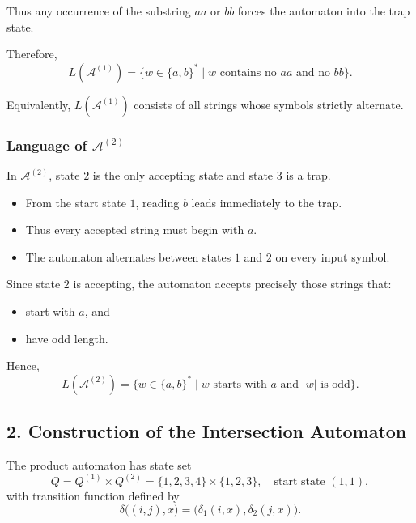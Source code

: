 \documentclass{article}
\theoremstyle{theorem}
\theoremstyle{definition}
\theoremstyle{remark}
\begin{document}
Thus any occurrence of the substring $aa$ or $bb$ forces the automaton into the trap state.

Therefore,
\[
L(\mathcal A^{(1)}) 
= \{ w \in \{a,b\}^* \mid w \text{ contains no } aa \text{ and no } bb \}.
\]

Equivalently, $L(\mathcal A^{(1)})$ consists of all strings whose symbols strictly alternate.

\bigskip

\subsubsection*{Language of $\mathcal A^{(2)}$}

In $\mathcal A^{(2)}$, state $2$ is the only accepting state and state $3$ is a trap.

\begin{itemize}
    \item From the start state $1$, reading $b$ leads immediately to the trap.
    \item Thus every accepted string must begin with $a$.
    \item The automaton alternates between states $1$ and $2$ on every input symbol.
\end{itemize}

Since state $2$ is accepting, the automaton accepts precisely those strings that:
\begin{itemize}
    \item start with $a$, and
    \item have odd length.
\end{itemize}

Hence,
\[
L(\mathcal A^{(2)}) 
= \{ w \in \{a,b\}^* \mid w \text{ starts with } a \text{ and } |w| \text{ is odd} \}.
\]

\bigskip

\subsection*{2. Construction of the Intersection Automaton}

The product automaton has state set
\[
Q = Q^{(1)} \times Q^{(2)} = \{1,2,3,4\} \times \{1,2,3\}, \quad \text{start state } (1,1),
\]
with transition function defined by
\[
\delta\big((i,j), x\big) = \big(\delta_1(i,x), \delta_2(j,x)\big).
\]
\end{document}
